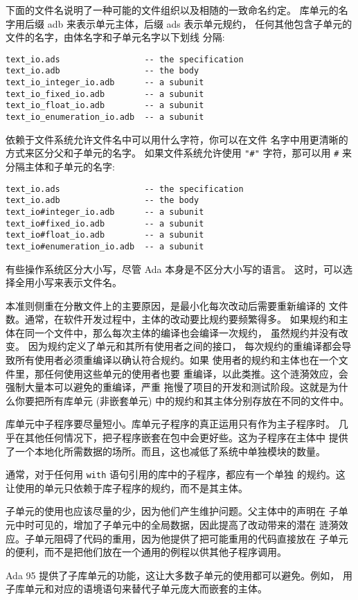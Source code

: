 \begin{blockindent}
下面的文件名说明了一种可能的文件组织以及相随的一致命名约定。
库单元的名字用后缀 adb 来表示单元主体，后缀 ads 表示单元规约，
任何其他包含子单元的文件的名字，由体名字和子单元名字以下划线
分隔:
\begin{lstlisting}
text_io.ads                 -- the specification
text_io.adb                 -- the body
text_io_integer_io.adb      -- a subunit
text_io_fixed_io.adb        -- a subunit
text_io_float_io.adb        -- a subunit
text_io_enumeration_io.adb  -- a subunit
\end{lstlisting}

依赖于文件系统允许文件名中可以用什么字符，你可以在文件
名字中用更清晰的方式来区分父和子单元的名字。
如果文件系统允许使用 \texttt{"\#"} 字符，那可以用 \texttt{\#}
来分隔主体和子单元的名字:
\begin{lstlisting}
text_io.ads                 -- the specification
text_io.adb                 -- the body
text_io#integer_io.adb      -- a subunit
text_io#fixed_io.adb        -- a subunit
text_io#float_io.adb        -- a subunit
text_io#enumeration_io.adb  -- a subunit
\end{lstlisting}

有些操作系统区分大小写，尽管 Ada 本身是不区分大小写的语言。
这时，可以选择全用小写来表示文件名。
\end{blockindent}

\begin{blockindent}
本准则侧重在分散文件上的主要原因，是最小化每次改动后需要重新编译的
文件数。通常，在软件开发过程中，主体的改动要比规约要频繁得多。
如果规约和主体在同一个文件中，那么每次主体的编译也会编译一次规约，
虽然规约并没有改变。 因为规约定义了单元和其所有使用者之间的接口，
每次规约的重编译都会导致所有使用者必须重编译以确认符合规约。如果
使用者的规约和主体也在一个文件里，那任何使用这些单元的使用者也要
重编译，以此类推。这个涟漪效应，会强制大量本可以避免的重编译，严重
拖慢了项目的开发和测试阶段。这就是为什么你要把所有库单元 (非嵌套单元)
中的规约和其主体分别存放在不同的文件中。

库单元中子程序要尽量短小。库单元子程序的真正运用只有作为主子程序时。
几乎在其他任何情况下，把子程序嵌套在包中会更好些。这为子程序在主体中
提供了一个本地化所需数据的场所。而且，这也减低了系统中单独模块的数量。

通常，对于任何用 \texttt{with} 语句引用的库中的子程序，都应有一个单独
的规约。这让使用的单元只依赖于库子程序的规约，而不是其主体。

子单元的使用也应该尽量的少，因为他们产生维护问题。父主体中的声明在
子单元中时可见的，增加了子单元中的全局数据，因此提高了改动带来的潜在
涟漪效应。子单元阻碍了代码的重用，因为他提供了把可能重用的代码直接放在
子单元的便利，而不是把他们放在一个通用的例程以供其他子程序调用。

Ada 95 提供了子库单元的功能，这让大多数子单元的使用都可以避免。例如，
用子库单元和对应的语境语句来替代子单元庞大而嵌套的主体。

\end{blockindent}
